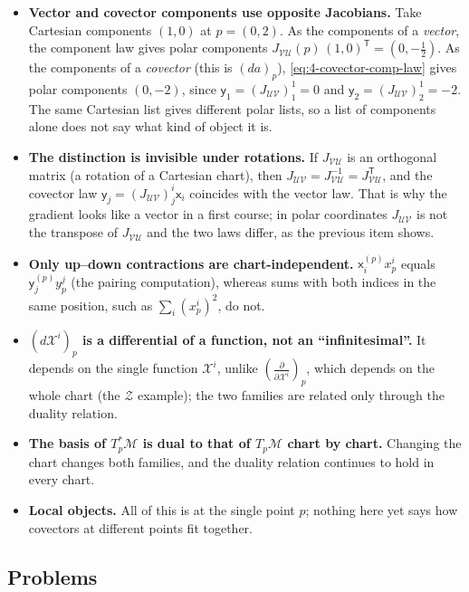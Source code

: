 \documentclass[11pt]{article}
\newcommand{\TpM}{T_p\mathcal M}
\newcommand{\TpsM}{T_p^*\mathcal M}
\begin{document}
\begin{itemize}
  \item \textbf{Vector and covector components use opposite Jacobians.} Take Cartesian components $(1,0)$ at $p=(0,2)$. As the components of a \emph{vector}, the component law gives polar components $J_{\mathcal{VU}}(p)\,(1,0)^{\mathsf T}=(0,-\tfrac12)$. As the components of a \emph{covector} (this is $(da)_p$), \eqref{eq:4-covector-comp-law} gives polar components $(0,-2)$, since $\mathsf y_1=(J_{\mathcal{UV}})^1_1=0$ and $\mathsf y_2=(J_{\mathcal{UV}})^1_2=-2$. The same Cartesian list gives different polar lists, so a list of components alone does not say what kind of object it is.
  \item \textbf{The distinction is invisible under rotations.} If $J_{\mathcal{VU}}$ is an orthogonal matrix (a rotation of a Cartesian chart), then $J_{\mathcal{UV}}=J_{\mathcal{VU}}^{-1}=J_{\mathcal{VU}}^{\mathsf T}$, and the covector law $\mathsf y_j=(J_{\mathcal{UV}})^i_j\mathsf x_i$ coincides with the vector law. That is why the gradient looks like a vector in a first course; in polar coordinates $J_{\mathcal{UV}}$ is not the transpose of $J_{\mathcal{VU}}$ and the two laws differ, as the previous item shows.
  \item \textbf{Only up--down contractions are chart-independent.} $\mathsf x^{(p)}_i x^i_p$ equals $\mathsf y^{(p)}_j y^j_p$ (the pairing computation), whereas sums with both indices in the same position, such as $\sum_i(x^i_p)^2$, do not.
  \item \textbf{$(d\mathcal X^i)_p$ is a differential of a function, not an ``infinitesimal''.} It depends on the single function $\mathcal X^i$, unlike $\left(\frac{\partial}{\partial\mathcal X^i}\right)_p$, which depends on the whole chart (the $\mathcal Z$ example); the two families are related only through the duality relation.
  \item \textbf{The basis of $\TpsM$ is dual to that of $\TpM$ chart by chart.} Changing the chart changes both families, and the duality relation continues to hold in every chart.
  \item \textbf{Local objects.} All of this is at the single point $p$; nothing here yet says how covectors at different points fit together.
\end{itemize}

\subsection*{Problems}
\end{document}
